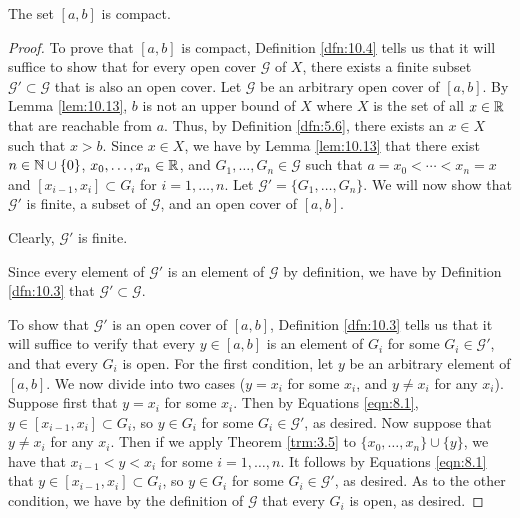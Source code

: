 \documentclass[../main.tex]{subfiles}
\begin{document}
\begin{theorem}\label{trm:10.14}
    The set $[a,b]$ is compact.
    \begin{proof}

        To prove that $[a,b]$ is compact, Definition \ref{dfn:10.4} tells us that it will suffice to show that for every open cover $\mathcal{G}$ of $X$, there exists a finite subset $\mathcal{G}'\subset\mathcal{G}$ that is also an open cover. Let $\mathcal{G}$ be an arbitrary open cover of $[a,b]$. By Lemma \ref{lem:10.13}, $b$ is not an upper bound of $X$ where $X$ is the set of all $x\in\mathbb{R}$ that are reachable from $a$. Thus, by Definition \ref{dfn:5.6}, there exists an $x\in X$ such that $x>b$. Since $x\in X$, we have by Lemma \ref{lem:10.13} that there exist $n\in\mathbb{N}\cup\{0\}$, $x_0,\dots,x_n\in\mathbb{R}$, and $G_1,\dots,G_n\in\mathcal{G}$ such that $a=x_0<\cdots<x_n=x$ and $[x_{i-1},x_i]\subset G_i$ for $i=1,\dots,n$. Let $\mathcal{G}'=\{G_1,\dots,G_n\}$. We will now show that $\mathcal{G}'$ is finite, a subset of $\mathcal{G}$, and an open cover of $[a,b]$.\par
        Clearly, $\mathcal{G}'$ is finite.\par
        Since every element of $\mathcal{G}'$ is an element of $\mathcal{G}$ by definition, we have by Definition \ref{dfn:10.3} that $\mathcal{G}'\subset\mathcal{G}$.\par
        To show that $\mathcal{G}'$ is an open cover of $[a,b]$, Definition \ref{dfn:10.3} tells us that it will suffice to verify that every $y\in[a,b]$ is an element of $G_i$ for some $G_i\in\mathcal{G}'$, and that every $G_i$ is open. For the first condition, let $y$ be an arbitrary element of $[a,b]$. We now divide into two cases ($y=x_i$ for some $x_i$, and $y\neq x_i$ for any $x_i$). Suppose first that $y=x_i$ for some $x_i$. Then by Equations \ref{eqn:8.1}, $y\in[x_{i-1},x_i]\subset G_i$, so $y\in G_i$ for some $G_i\in\mathcal{G}'$, as desired. Now suppose that $y\neq x_i$ for any $x_i$. Then if we apply Theorem \ref{trm:3.5} to $\{x_0,\dots,x_n\}\cup\{y\}$, we have that $x_{i-1}<y<x_i$ for some $i=1,\dots,n$. It follows by Equations \ref{eqn:8.1} that $y\in[x_{i-1},x_i]\subset G_i$, so $y\in G_i$ for some $G_i\in\mathcal{G}'$, as desired. As to the other condition, we have by the definition of $\mathcal{G}$ that every $G_i$ is open, as desired.
    \end{proof}
\end{theorem}
\end{document}
